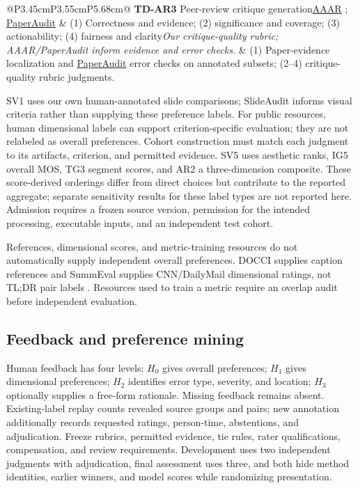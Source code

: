 \begin{longtable}{@{}P{3.45cm}P{3.55cm}P{5.68cm}@{}}
\addlinespace
\textbf{TD-AR3} Peer-review critique generation\newline \href{https://huggingface.co/datasets/Reza8848/AAAR-1.0}{AAAR} \citep{lou2025aaar}; \href{https://github.com/TU2021/PaperAudit}{PaperAudit} \citep{tu2026paperaudit} & (1) Correctness and evidence; (2) significance and coverage; (3) actionability; (4) fairness and clarity\newline\emph{Our critique-quality rubric; AAAR/PaperAudit inform evidence and error checks.} & (1) Paper-evidence localization and \href{https://github.com/TU2021/PaperAudit}{PaperAudit} error checks on annotated subsets; (2--4) critique-quality rubric judgments.\\
\end{longtable}
\endgroup


SV1 uses our own human-annotated slide comparisons; SlideAudit informs visual criteria rather than supplying these preference labels.
For public resources, human dimensional labels can support criterion-specific evaluation; they are not relabeled as overall preferences.
Cohort construction must match each judgment to its artifacts, criterion, and permitted evidence.
SV5 uses aesthetic ranks, IG5 overall MOS, TG3 segment scores, and AR2 a three-dimension composite.
These score-derived orderings differ from direct choices but contribute to the reported aggregate; separate sensitivity results for these label types are not reported here.
Admission requires a frozen source version, permission for the intended processing, executable inputs, and an independent test cohort.

References, dimensional scores, and metric-training resources do not automatically supply independent overall preferences.
DOCCI supplies caption references \citep{onoe2025docci} and SummEval supplies CNN/DailyMail dimensional ratings, not TL;DR pair labels \citep{fabbri2021summeval}.
Resources used to train a metric require an overlap audit before independent evaluation.

\subsection{Feedback and preference mining}
\label{app:annotation}
Human feedback has four levels: $H_0$ gives overall preferences; $H_1$ gives dimensional preferences; $H_2$ identifies error type, severity, and location; $H_3$ optionally supplies a free-form rationale.
Missing feedback remains absent.
Existing-label replay counts revealed source groups and pairs; new annotation additionally records requested ratings, person-time, abstentions, and adjudication.
Freeze rubrics, permitted evidence, tie rules, rater qualifications, compensation, and review requirements.
Development uses two independent judgments with adjudication, final assessment uses three, and both hide method identities, earlier winners, and model scores while randomizing presentation.


